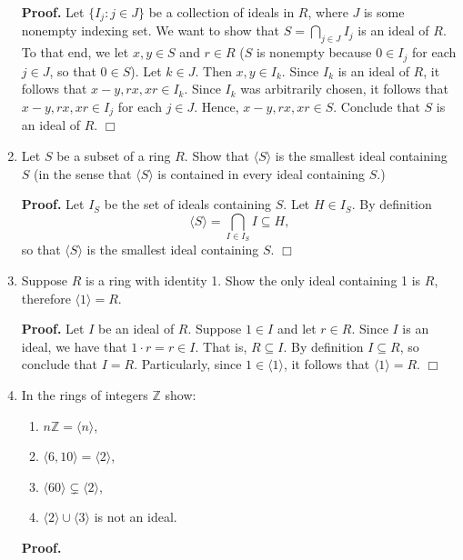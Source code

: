 \documentclass[9pt]{article}
\newcommand{\qed}{\hfill \ensuremath{\Box}}
\newcommand{\cyc}[1]{\langle #1 \rangle}
\newcommand{\Z}{\mathbb{Z}}
\begin{document}
\begin{enumerate}
      \textbf{Proof.} Let $\{I_j : j \in J\}$ be a collection of ideals in $R$,
      where $J$ is some nonempty indexing set. We want to show that
      $S = \bigcap_{j \in J}I_j$ is an ideal of $R$. To that end, we let $x, y
      \in S$ and $r \in R$ ($S$ is nonempty because $0 \in I_j$ for each
      $j \in J$, so that $0 \in S$). Let $k \in J$. Then $x, y \in I_k$. Since
      $I_k$ is an ideal of $R$, it follows that $x - y, rx, xr \in I_k$. Since
      $I_k$ was arbitrarily chosen, it follows that $x - y, rx, xr \in I_j$ for
      each $j \in J$. Hence, $x - y, rx, xr \in S$. Conclude that $S$ is an
      ideal of $R$. \qed
   \item Let $S$ be a subset of a ring $R$. Show that $\cyc{S}$ is the smallest
         ideal containing $S$ (in the sense that $\cyc{S}$ is contained in
         every ideal containing $S$.)
         
      \textbf{Proof.} Let $I_S$ be the set of ideals containing $S$.
      Let $H \in I_S$. By definition
      $$\cyc{S} = \bigcap_{I \in I_S}I \subseteq H,$$
      so that $\cyc{S}$ is the smallest ideal containing $S$. \qed
   \item Suppose $R$ is a ring with identity 1. Show the only ideal containing
         1 is $R$, therefore $\cyc{1} = R$.
         
      \textbf{Proof.}  Let $I$ be an ideal of $R$. Suppose $1 \in I$ and let
      $r \in R$. Since $I$ is an ideal, we have that $1 \cdot r = r \in I$. That
      is, $R \subseteq I$. By definition $I \subseteq R$, so conclude that
      $I = R$. Particularly, since $1 \in \cyc{1}$, it follows that
      $\cyc{1} = R$. \qed
   \item In the rings of integers $\Z$ show:
         \begin{enumerate}
            \item $n\Z = \cyc{n}$,
            \item $\cyc{6, 10} = \cyc{2}$,
            \item $\cyc{60} \subsetneq \cyc{2}$,
            \item $\cyc{2} \cup \cyc{3}$ is not an ideal.
         \end{enumerate}
         
      \textbf{Proof.}
      

\end{enumerate}
\end{document}
